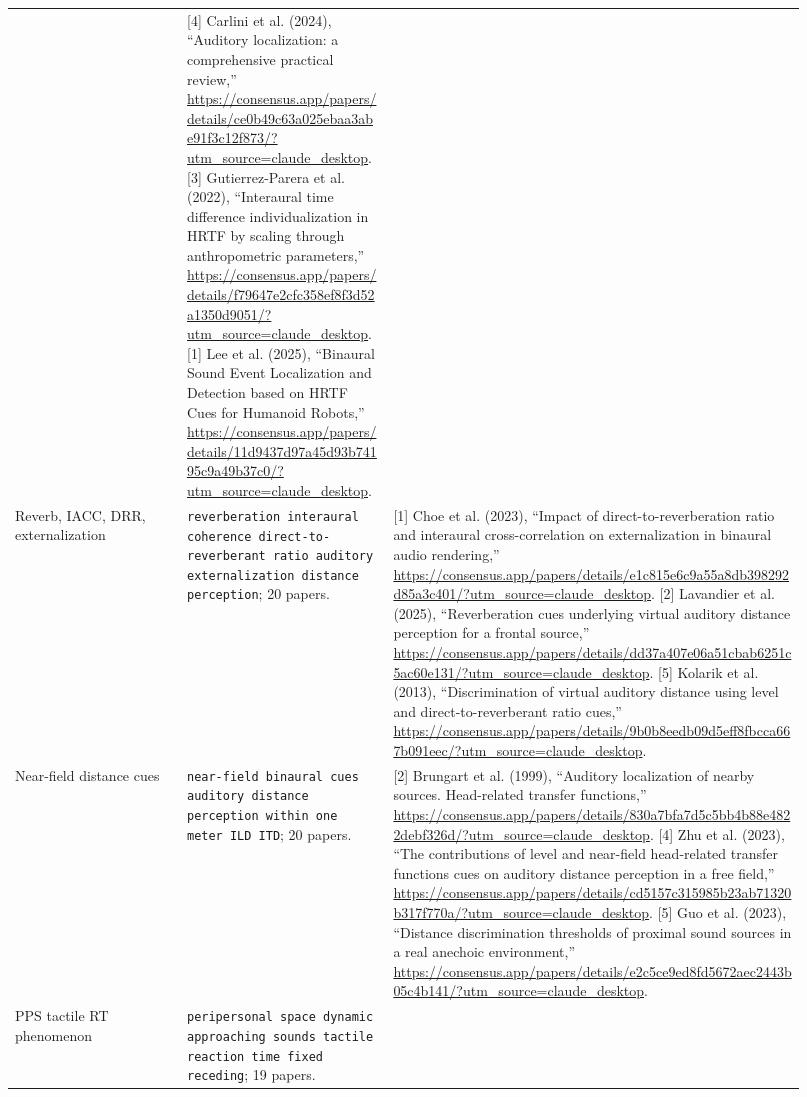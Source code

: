 \begin{longtable}{P{0.20\linewidth} P{0.24\linewidth} P{0.48\linewidth}}
& [4] Carlini et al. (2024), ``Auditory localization: a comprehensive practical review,'' \url{https://consensus.app/papers/details/ce0b49c63a025ebaa3abe91f3c12f873/?utm_source=claude_desktop}. [3] Gutierrez-Parera et al. (2022), ``Interaural time difference individualization in HRTF by scaling through anthropometric parameters,'' \url{https://consensus.app/papers/details/f79647e2cfc358ef8f3d52a1350d9051/?utm_source=claude_desktop}. [1] Lee et al. (2025), ``Binaural Sound Event Localization and Detection based on HRTF Cues for Humanoid Robots,'' \url{https://consensus.app/papers/details/11d9437d97a45d93b74195c9a49b37c0/?utm_source=claude_desktop}.\\
\addlinespace
Reverb, IACC, DRR, externalization
& \texttt{reverberation interaural coherence direct-to-reverberant ratio auditory externalization distance perception}; 20 papers.
& [1] Choe et al. (2023), ``Impact of direct-to-reverberation ratio and interaural cross-correlation on externalization in binaural audio rendering,'' \url{https://consensus.app/papers/details/e1c815e6c9a55a8db398292d85a3c401/?utm_source=claude_desktop}. [2] Lavandier et al. (2025), ``Reverberation cues underlying virtual auditory distance perception for a frontal source,'' \url{https://consensus.app/papers/details/dd37a407e06a51cbab6251c5ac60e131/?utm_source=claude_desktop}. [5] Kolarik et al. (2013), ``Discrimination of virtual auditory distance using level and direct-to-reverberant ratio cues,'' \url{https://consensus.app/papers/details/9b0b8eedb09d5eff8fbcca667b091eec/?utm_source=claude_desktop}.\\
\addlinespace
Near-field distance cues
& \texttt{near-field binaural cues auditory distance perception within one meter ILD ITD}; 20 papers.
& [2] Brungart et al. (1999), ``Auditory localization of nearby sources. Head-related transfer functions,'' \url{https://consensus.app/papers/details/830a7bfa7d5c5bb4b88e4822debf326d/?utm_source=claude_desktop}. [4] Zhu et al. (2023), ``The contributions of level and near-field head-related transfer functions cues on auditory distance perception in a free field,'' \url{https://consensus.app/papers/details/cd5157c315985b23ab71320b317f770a/?utm_source=claude_desktop}. [5] Guo et al. (2023), ``Distance discrimination thresholds of proximal sound sources in a real anechoic environment,'' \url{https://consensus.app/papers/details/e2c5ce9ed8fd5672aec2443b05c4b141/?utm_source=claude_desktop}.\\
\addlinespace
PPS tactile RT phenomenon
& \texttt{peripersonal space dynamic approaching sounds tactile reaction time fixed receding}; 19 papers.

\end{longtable}
